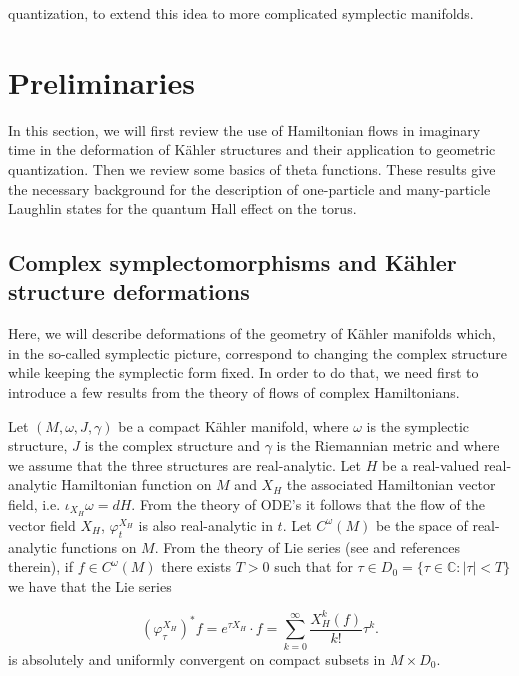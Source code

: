 \documentclass[a4paper,11pt]{article}
\begin{document}
quantization, to extend this idea to more complicated symplectic manifolds.














\section{Preliminaries}
\label{sect:Preliminary_Concepts}

In this section, we will first review the use of Hamiltonian flows in imaginary time in the deformation of Kähler structures and their application to geometric quantization. Then we review some basics of theta functions. These results  give the necessary background for the description of one-particle and many-particle Laughlin states for 
the quantum Hall effect on the torus.


\subsection{Complex symplectomorphisms and K\"ahler structure deformations}
\label{sub:Hamiltonian_Flows_Imaginary_Time}

Here, we will describe deformations of the geometry of Kähler manifolds which, in the so-called symplectic picture, correspond to changing the complex structure while keeping the symplectic form fixed. In order to do that, we need first to introduce a few results from the theory of flows of complex Hamiltonians. 

Let $(M, \omega, J, \gamma)$ be a compact Kähler manifold, where $\omega$ is the symplectic structure, $J$ is the complex structure and $\gamma$ is the Riemannian metric and where we assume that the three structures are 
real-analytic. Let $H$ be a real-valued real-analytic Hamiltonian function on $M$ and $X_{H}$ the associated Hamiltonian vector field, i.e. $\iota_{X_H}\omega = dH$. From the theory of ODE's it follows that the flow of the vector field $X_{H}$, $\varphi^{X_H}_{t}$ is also real-analytic in $t$. Let $C^{\omega}(M)$ be the space of real-analytic functions on $M$. From the theory of Lie series (see \cite{MouraoPimentelComplextime} and references therein), if $f\in C^{\omega}(M)$ there exists $T>0$ such that for $\tau\in D_{0}=\{\tau \in \mathbb{C}:|\tau|<T\}$ we have that the Lie series

\begin{equation}
\left(\varphi^{X_H}_{\tau}\right)^{*}f = e^{\tau X_{H}}\cdot f = \sum_{k=0}^{\infty} \frac{X_{H}^k(f)}{k!}\tau^k.
\label{eq:Hamiltonian_flow}
\end{equation}
is absolutely and uniformly convergent on compact subsets in $M\times D_{0}$.
\end{document}
